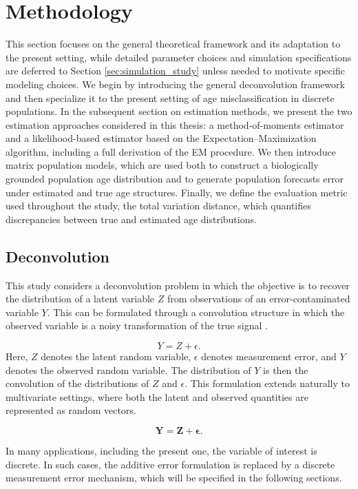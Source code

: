 \documentclass[11pt,a4paper]{article}
\begin{document}
\section{Methodology}\label{stycke2}

This section focuses on the general theoretical framework and its adaptation to the present setting, while detailed parameter choices and simulation specifications are deferred to Section \ref{sec:simulation_study} unless needed to motivate specific modeling choices. We begin by introducing the general deconvolution framework and then specialize it to the present setting of age misclassification in discrete populations. In the subsequent section on estimation methods, we present the two estimation approaches considered in this thesis: a method-of-moments estimator and a likelihood-based estimator based on the Expectation--Maximization algorithm, including a full derivation of the EM procedure. We then introduce matrix population models, which are used both to construct a biologically grounded population age distribution and to generate population forecasts error under estimated and true age structures. Finally, we define the evaluation metric used throughout the study, the total variation distance, which quantifies discrepancies between true and estimated age distributions.

\subsection{Deconvolution}\label{sec:deconvolution}

This study considers a deconvolution problem in which the objective is to recover the distribution of a latent variable \(Z\) from observations of an error-contaminated variable \(Y\). This can be formulated through a convolution structure in which the observed variable is a noisy transformation of the true signal \parencite[Chapter 12]{carroll2006}.

\[
Y = Z + \epsilon.
\]
Here, $Z$ denotes the latent random variable, $\epsilon$ denotes measurement error, and $Y$ denotes the observed random variable. The distribution of $Y$ is then the convolution of the distributions of $Z$ and $\epsilon$. This formulation extends naturally to multivariate settings, where both the latent and observed quantities are represented as random vectors.

\[
\mathbf{Y} = \mathbf{Z} + \mathbf{\epsilon}.
\]

In many applications, including the present one, the variable of interest is discrete. In such cases, the additive error formulation is replaced by a discrete measurement error mechanism, which will be specified in the following sections.
\end{document}
